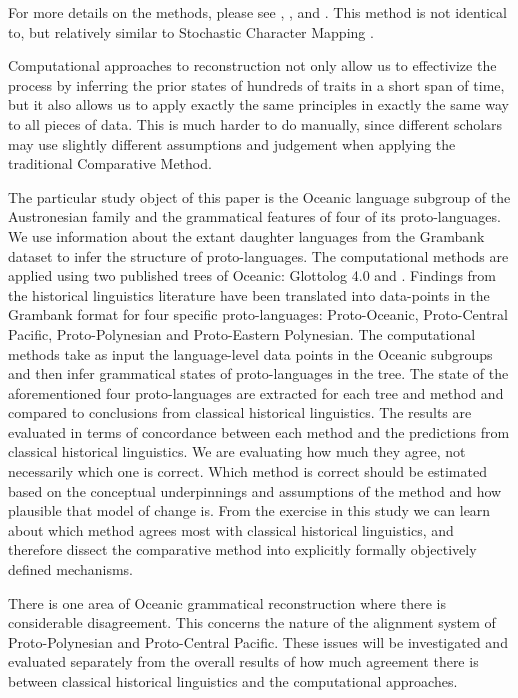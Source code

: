 \documentclass[a4paper,10pt]{article} %
\begin{document}
For more details on the methods, please see  \citet{goldstein_2022}, \citet{pagel2004bayesian}, \citet{ronquist2004bayesian} and \citet{liggett2010continuous}. This method is not identical to, but relatively similar to Stochastic Character Mapping \citep{huelsenbeck2003stochastic}.

Computational approaches to reconstruction not only allow us to effectivize the process by inferring the prior states of hundreds of traits in a short span of time, but it also allows us to apply exactly the same principles in exactly the same way to all pieces of data. This is much harder to do manually, since different scholars may use slightly different assumptions and judgement when applying the traditional Comparative Method. 

The particular study object of this paper is the Oceanic language subgroup of the Austronesian family and the grammatical features of four of its proto-languages. We use information about the extant daughter languages from the Grambank dataset \citep{grambankwebsite} to infer the structure of proto-languages. The computational methods are applied using two published trees of Oceanic: Glottolog 4.0 and \citet{grayetal_2009}. Findings from the historical linguistics literature have been translated into data-points in the Grambank format for four specific proto-languages: Proto-Oceanic, Proto-Central Pacific, Proto-Polynesian and Proto-Eastern Polynesian. The computational methods take as input the language-level data points in the Oceanic subgroups and then infer grammatical states of proto-languages in the tree. The state of the aforementioned four proto-languages are extracted for each tree and method and compared to conclusions from classical historical linguistics. The results are evaluated in terms of concordance between each method and the predictions from classical historical linguistics. We are evaluating how much they agree, not necessarily which one is correct. Which method is correct should be estimated based on the conceptual underpinnings and assumptions of the method and how plausible that model of change is. From the exercise in this study we can learn about which method agrees most with classical historical linguistics, and therefore dissect the comparative method into explicitly formally objectively defined mechanisms.

There is one area of Oceanic grammatical reconstruction where there is considerable disagreement. This concerns the nature of the alignment system of Proto-Polynesian and Proto-Central Pacific. These issues will be investigated and evaluated separately from the overall results of how much agreement there is between classical historical linguistics and the computational approaches.
\end{document}
